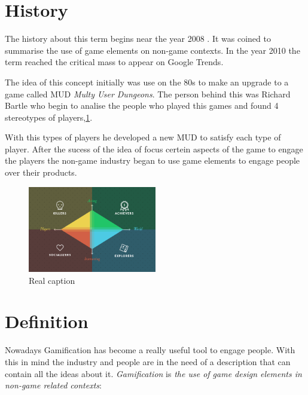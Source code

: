 \section{History}

The history about this term begins near the year 2008 \cite{DefineGamefication}. 
It was coined to summarise the use of game elements on non-game contexts.
In the year 2010 the term reached the critical mass to appear on Google
Trends\cite{LiCap1.3}.

The idea of this concept initially was use on the 80s to make an upgrade to a 
game called MUD \emph{Multy User Dungeons}. The person behind this was Richard Bartle
who begin to analise the people who played this games and found 4 stereotypes of
players,\ref{fig:Players}.

With this types of players he developed a new MUD to satisfy each type of player.
After the sucess of the idea of focus certein aspects of the game to engage the players
the non-game industry began to use game elements to engage people over their products. 

\begin{figure}[!htb]
  \centering
  \includegraphics[width=0.5\textwidth]{images/TypeOfPlayersBartle.png}
  \caption[Caption for LOF]{Real caption\footnotemark}
  \label{fig:Players}
\end{figure}

 	
\section{Definition}

Nowadays Gamification has become a really useful tool to engage people. With this in
mind the industry and people are in the need of a description that can contain
all the ideas about it. \emph{Gamification} is \emph{the use of game design elements
in non-game related contexts}:

